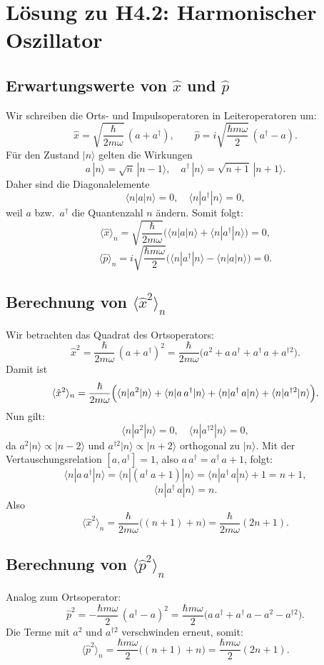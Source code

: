 \documentclass{article}
\begin{document}
\section{Lösung zu H4.2: Harmonischer Oszillator}
\subsection*{Erwartungswerte von $\hat x$ und $\hat p$}
Wir schreiben die Orts- und Impulsoperatoren in Leiteroperatoren um:
\[
  \hat x = \sqrt{\frac{\hbar}{2m\omega}}\,(a + a^\dagger), 
  \qquad
  \hat p = i\sqrt{\frac{\hbar m\omega}{2}}\,(a^\dagger - a).
\]
Für den Zustand $|n\rangle$ gelten die Wirkungen
\[
  a\,|n\rangle = \sqrt{n}\,|n-1\rangle,
  \quad
  a^\dagger\,|n\rangle = \sqrt{n+1}\,|n+1\rangle.
\]
Daher sind die Diagonalelemente
\[
  \langle n|a|n\rangle = 0,
  \quad
  \langle n|a^\dagger|n\rangle = 0,
\]
weil $a$ bzw.\ $a^\dagger$ die Quantenzahl $n$ ändern. Somit folgt:
\[
  \langle \hat x \rangle_n 
  = \sqrt{\frac{\hbar}{2m\omega}}\bigl(\langle n|a|n\rangle + \langle n|a^\dagger|n\rangle\bigr)
  = 0,
\]
\[
  \langle \hat p \rangle_n
  = i\sqrt{\frac{\hbar m\omega}{2}}\bigl(\langle n|a^\dagger|n\rangle - \langle n|a|n\rangle\bigr)
  = 0.
\]

\subsection*{Berechnung von $\langle \hat x^2 \rangle_n$}
Wir betrachten das Quadrat des Ortsoperators:
\[
  \hat x^2 
  = \frac{\hbar}{2m\omega}\,(a + a^\dagger)^2
  = \frac{\hbar}{2m\omega}\bigl(a^2 + a\,a^\dagger + a^\dagger\,a + a^{\dagger2}\bigr).
\]
Damit ist
\[
  \langle \hat x^2 \rangle_n
  = \frac{\hbar}{2m\omega}\Bigl(\langle n|a^2|n\rangle 
    + \langle n|a\,a^\dagger|n\rangle 
    + \langle n|a^\dagger\,a|n\rangle 
    + \langle n|a^{\dagger2}|n\rangle\Bigr).
\]
Nun gilt:
\[
  \langle n|a^2|n\rangle = 0, 
  \quad
  \langle n|a^{\dagger2}|n\rangle = 0,
\]
da $a^2|n\rangle\propto|n-2\rangle$ und $a^{\dagger2}|n\rangle\propto|n+2\rangle$ orthogonal zu $|n\rangle$.  
Mit der Vertauschungsrelation $[a,a^\dagger]=1$, also $a\,a^\dagger = a^\dagger\,a + 1$, folgt:
\[
  \langle n|a\,a^\dagger|n\rangle
  = \langle n|(a^\dagger\,a + 1)|n\rangle
  = \langle n|a^\dagger\,a|n\rangle + 1
  = n + 1,
\]
\[
  \langle n|a^\dagger\,a|n\rangle = n.
\]
Also
\[
  \langle \hat x^2 \rangle_n
  = \frac{\hbar}{2m\omega}\bigl((n+1) + n\bigr)
  = \frac{\hbar}{2m\omega}(2n+1).
\]

\subsection*{Berechnung von $\langle \hat p^2 \rangle_n$}
Analog zum Ortsoperator:
\[
  \hat p^2
  = -\frac{\hbar m\omega}{2}\,(a^\dagger - a)^2
  = \frac{\hbar m\omega}{2}\bigl(a\,a^\dagger + a^\dagger\,a - a^2 - a^{\dagger2}\bigr).
\]
Die Terme mit $a^2$ und $a^{\dagger2}$ verschwinden erneut, somit:
\[
  \langle \hat p^2 \rangle_n
  = \frac{\hbar m\omega}{2}\bigl((n+1) + n\bigr)
  = \frac{\hbar m\omega}{2}(2n+1).
\]
\end{document}
